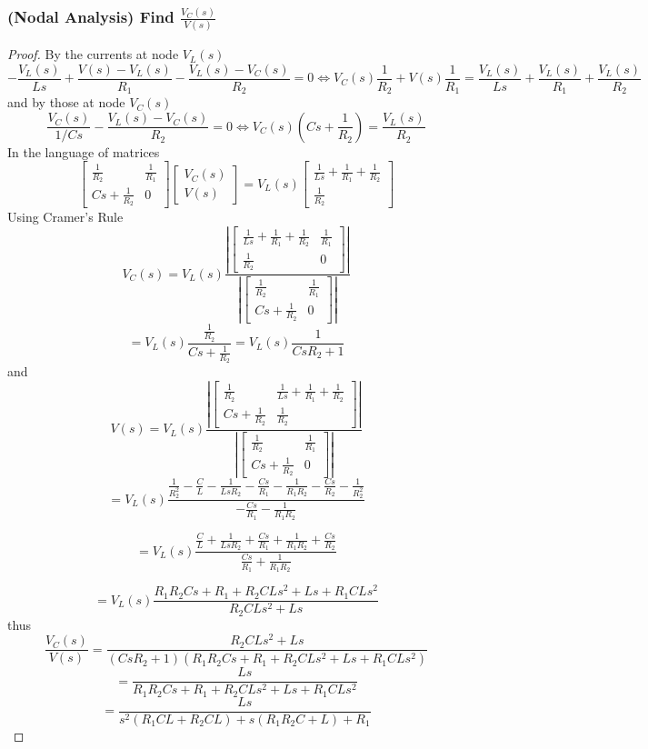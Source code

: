 \documentclass[11pt]{article}
\newcommand{\abs}[1]{\left\lvert #1 \right\rvert}%
\begin{document}
 \subsubsection{(Nodal Analysis) Find $\frac{V_C(s)}{V(s)}$}
 \begin{proof}
 	By the currents at node $V_L(s)$
 	\[ -\frac{V_L(s)}{Ls} + \frac{V(s) - V_L(s)}{R_1} - \frac{V_L(s) - V_C(s)}{R_2}= 0 \iff V_C(s)\frac{1}{R_2} + V(s)\frac{1}{R_1} = \frac{V_L(s)}{Ls} + \frac{V_L(s)}{R_1} + \frac{V_L(s)}{R_2}\]
 	and by those at node $V_C(s)$
 	\[\frac{V_C(s)}{1/Cs} - \frac{V_L(s) - V_C(s)}{R_2} = 0 \iff V_C(s)(Cs + \frac{1}{R_2}) =  \frac{V_L(s)}{R_2}\]
 	In the language of matrices
 	\[\begin{bmatrix}
 		\frac{1}{R_2} & \frac{1}{R_1} \\
 		Cs + \frac{1}{R_2} & 0 
 	\end{bmatrix} \begin{bmatrix}
 	V_C(s) \\ V(s)
 \end{bmatrix} = V_L(s)\begin{bmatrix}
 \frac{1}{Ls} + \frac{1}{R_1} + \frac{1}{R_2} \\ \frac{1}{R_2}
\end{bmatrix}\]
Using Cramer's Rule
\[V_C(s) = V_L(s)\frac{\abs{\begin{bmatrix}
	\frac{1}{Ls} + \frac{1}{R_1} + \frac{1}{R_2} & \frac{1}{R_1} \\ \frac{1}{R_2} & 0		
\end{bmatrix}}}{\abs{\begin{bmatrix}
\frac{1}{R_2} & \frac{1}{R_1} \\
Cs + \frac{1}{R_2} & 0 
\end{bmatrix}}}\]
\[= V_L(s)\frac{\frac{1}{R_2}}{Cs + \frac{1}{R_2}} = V_L(s)\frac{1}{CsR_2 + 1}\]
and
\[V(s) = V_L(s)\frac{\abs{\begin{bmatrix}
				\frac{1}{R_2} & \frac{1}{Ls} + \frac{1}{R_1} + \frac{1}{R_2} \\
			Cs + \frac{1}{R_2} & \frac{1}{R_2}
\end{bmatrix}}}{\abs{\begin{bmatrix}
			\frac{1}{R_2} & \frac{1}{R_1} \\
			Cs + \frac{1}{R_2} & 0 
\end{bmatrix}}}\]
\[= V_L(s) \frac{\frac{1}{R_2^2} - \frac{C}{L} - \frac{1}{LsR_2} - \frac{Cs}{R_1} - \frac{1}{R_1R_2} - \frac{Cs}{R_2} - \frac{1}{R_2^2}}{-\frac{Cs}{R_1} - \frac{1}{R_1R_2}}\]

\[= V_L(s) \frac{ \frac{C}{L} + \frac{1}{LsR_2} + \frac{Cs}{R_1} + \frac{1}{R_1R_2} + \frac{Cs}{R_2}}{\frac{Cs}{R_1} + \frac{1}{R_1R_2}}\]

\[= V_L(s) \frac{ R_1R_2Cs + R_1 + R_2CLs^2 + Ls + R_1CLs^2 }{R_2CLs^2 + Ls}\]
thus 
\[\frac{V_C(s)}{V(s)} = \frac{R_2CLs^2 + Ls}{(CsR_2 + 1)( R_1R_2Cs + R_1 + R_2CLs^2 + Ls + R_1CLs^2)}\]
\[= \frac{Ls}{ R_1R_2Cs + R_1 + R_2CLs^2 + Ls + R_1CLs^2 }\]
\[= \frac{Ls}{ s^2(R_1CL + R_2CL) + s(R_1R_2C + L)  + R_1 }\]
 \end{proof}
\end{document}
